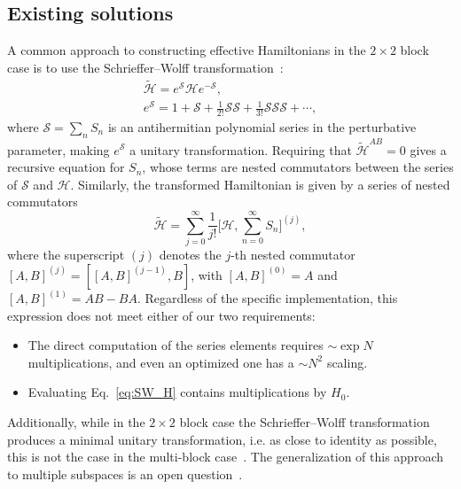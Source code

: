 \subsection{Existing solutions}
A common approach to constructing effective Hamiltonians in the $2\times 2$ block case is to use the Schrieffer--Wolff transformation~\cite{Schrieffer_1966}:
%
\begin{equation}
\begin{aligned}
\tilde{\mathcal{H}} = e^\mathcal{S} \mathcal{H} e^{-\mathcal{S}}, \\
e^{\mathcal{S}} = 1 + \mathcal{S} + \frac{1}{2!} \mathcal{S} \mathcal{S}
+ \frac{1}{3!} \mathcal{S} \mathcal{S} \mathcal{S} + \cdots,
\end{aligned}
\end{equation}
%
where $\mathcal{S} = \sum_n S_n$ is an antihermitian polynomial series in the perturbative parameter, making $e^\mathcal{S}$ a unitary transformation.
Requiring that $\tilde{\mathcal{H}}^{AB} = 0$ gives a recursive equation for $S_n$, whose terms are nested commutators between the series of $\mathcal{S}$ and $\mathcal{H}$.
Similarly, the transformed Hamiltonian is given by a series of nested commutators
%
\begin{equation}
\label{eq:SW_H}
\tilde{\mathcal{H}} = \sum_{j=0}^\infty \frac{1}{j!} \Big [\mathcal{H}, \sum_{n=0}^{\infty} S_n \Big ]^{(j)},
\end{equation}
%
where the superscript $(j)$ denotes the $j$-th nested commutator $[A, B]^{(j)} = [[A, B]^{(j-1)}, B]$, with $[A, B]^{(0)} = A$ and $[A, B]^{(1)} = AB - BA$.
Regardless of the specific implementation, this expression does not meet either of our two requirements:
\begin{itemize}
  \item The direct computation of the series elements requires $\sim \exp N$ multiplications, and even an optimized one has a $\sim N^2$ scaling.
  \item Evaluating Eq.~\eqref{eq:SW_H} contains multiplications by $H_0$.
\end{itemize}
Additionally, while in the $2\times 2$ block case the Schrieffer--Wolff transformation produces a minimal unitary transformation, i.e. as close to identity as possible, this is not the case in the multi-block case~\cite{Mankodi_2024}.
The generalization of this approach to multiple subspaces is an open question~\cite{Mankodi_2024}.

